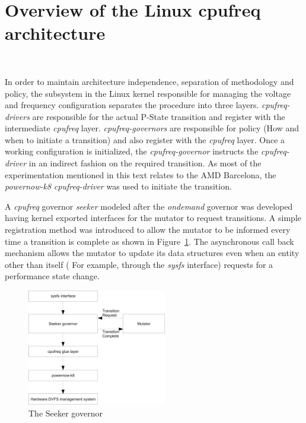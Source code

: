 \section{Overview of the Linux cpufreq architecture}~\label{sec:cpufreq}

In order to maintain architecture independence, separation of methodology 
and policy, the subsystem in the Linux kernel responsible for managing the 
voltage and frequency configuration separates the procedure into three layers. \textit{cpufreq-drivers}
are responsible for the actual P-State transition and register with the 
intermediate \textit{cpufreq} layer. \textit{cpufreq-governors} are responsible for
policy (How and when to initiate a transition) and also register with the 
\textit{cpufreq} layer. Once a working configuration is initialized, the 
\textit{cpufreq-governor} instructs the \textit{cpufreq-driver} in an indirect
fashion on the required transition. As most of the experimentation mentioned in
this text relates to the AMD Barcelona, the \textit{powernow-k8} \textit{cpufreq-driver}
was used to initiate the transition. 

A \textit{cpufreq} governor \textit{seeker} modeled after the \textit{ondemand} governor
was developed having kernel exported interfaces for the mutator to request transitions. 
A simple registration method was introduced to allow the mutator to be informed 
every time a transition is complete as shown in Figure~\ref{fig:governor}. 
The asynchronous call back mechanism allows the mutator to
update its data structures even when an entity other than itself ( For example, through
the \textit{sysfs} interface) requests for a performance state change. 

\begin{figure}[h!]
  \begin{center}
    \includegraphics[height=2in]{Figures/seeker_governor.jpg}%
    \caption{The Seeker governor}
    \label{fig:governor}
  \end{center}
\end{figure}

